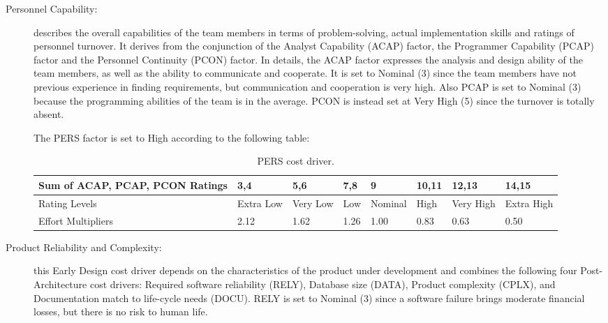 \begin{description}
\item[Personnel Capability:] describes the overall capabilities of the team members in terms of problem-solving, actual implementation skills and ratings of personnel turnover. It derives from the conjunction of the Analyst Capability (ACAP) factor, the Programmer Capability (PCAP) factor and the Personnel Continuity (PCON) factor. In details, the ACAP factor expresses the analysis and design ability of the team members, as well as the ability to communicate and cooperate. It is set to Nominal (3) since the team members have not previous experience in finding requirements, but  communication and cooperation is very high. Also PCAP is set to Nominal (3) because the programming abilities of the team is in the average. PCON is instead set at Very High (5) since the turnover is totally absent.

The PERS factor is set to High according to the following table:

\begin{table}[H]
	\begin{adjustwidth}{-.5in}{-.5in}
    \centering
    \begin{tabular}{p{4cm}|p{1cm}|p{1cm}|p{1cm}|p{1.5cm}|p{1cm}|p{1cm}|p{1cm}}
        \hline
        Sum of ACAP, PCAP, PCON Ratings & 3,4 & 5,6 & 7,8 & 9 & 10,11 & 12,13 & 14,15 \\
        \hline
        \hline
        Rating Levels & Extra Low & Very Low & Low & Nominal & High & Very High & Extra High \\
        \hline
        Effort Multipliers & 2.12 & 1.62 & 1.26 & 1.00 & 0.83 & 0.63 & 0.50 \\
        \hline
    \end{tabular}
    \caption{PERS cost driver.}
    \end{adjustwidth}
\end{table}

\item[Product Reliability and Complexity:] this Early Design cost driver depends on the characteristics of the product under development and combines the following four Post-Architecture cost drivers: Required software reliability (RELY), Database size (DATA), Product complexity (CPLX), and Documentation match to life-cycle needs (DOCU). RELY is set to Nominal (3) since a software failure brings moderate financial losses, but there is no risk to human life.


\end{description}

